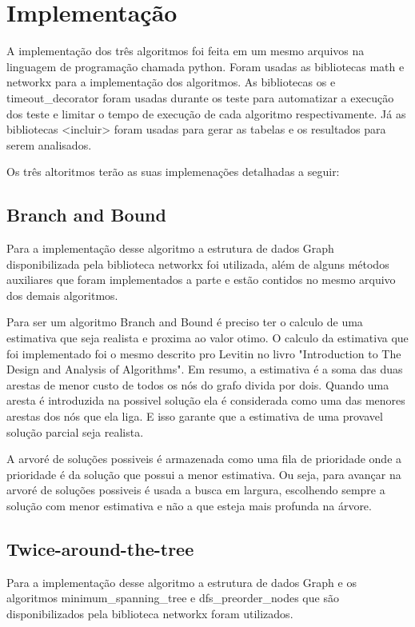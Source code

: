 \documentclass[12pt]{article}
\begin{document}
\section{Implementação}

A implementação dos três algoritmos foi feita em um mesmo arquivos na linguagem de programação chamada python. Foram usadas as bibliotecas math e networkx para a implementação dos algoritmos. As bibliotecas os e timeout\_decorator foram usadas durante os teste para automatizar a execução dos teste e limitar o tempo de execução de cada algoritmo respectivamente. Já as bibliotecas <incluir> foram usadas para gerar as tabelas e os resultados para serem analisados.

Os três altoritmos terão as suas implemenações detalhadas a seguir:

\subsection{Branch and Bound}

Para a implementação desse algoritmo a estrutura de dados Graph disponibilizada pela biblioteca networkx foi utilizada, além de alguns métodos auxiliares que foram implementados a parte e estão contidos no mesmo arquivo dos demais algoritmos.

Para ser um algoritmo Branch and Bound é preciso ter o calculo de uma estimativa que seja realista e proxima ao valor otimo. O calculo da estimativa que foi implementado foi o mesmo descrito pro Levitin no livro "Introduction to The Design and Analysis of Algorithms". Em resumo, a estimativa é a soma das duas arestas de menor custo de todos os nós do grafo divida por dois. Quando uma aresta é introduzida na possivel solução ela é considerada como uma das menores arestas dos nós que ela liga. E isso garante que a estimativa de uma provavel solução parcial seja realista.

A arvoré de soluções possiveis é armazenada como uma fila de prioridade onde a prioridade é da solução que possui a menor estimativa. Ou seja, para avançar na arvoré de soluções possiveis é usada a busca em largura, escolhendo sempre a solução com menor estimativa e não a que esteja mais profunda na árvore.

\subsection{Twice-around-the-tree}

Para a implementação desse algoritmo a estrutura de dados Graph e os algoritmos minimum\_spanning\_tree e dfs\_preorder\_nodes que são disponibilizados pela biblioteca networkx foram utilizados.
\end{document}
